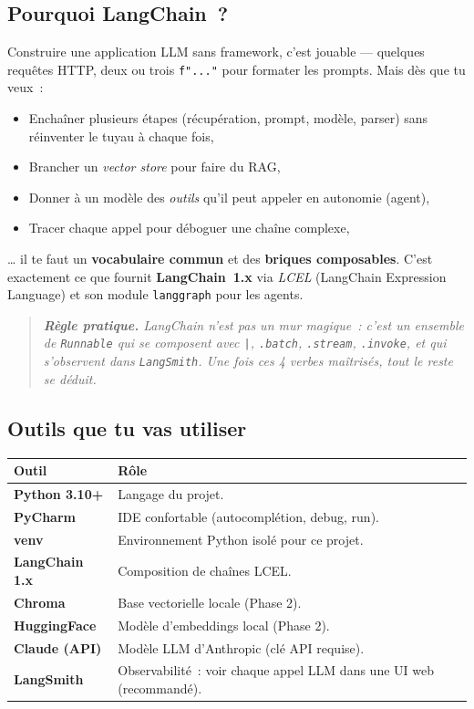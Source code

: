 \documentclass[11pt,a4paper]{article}
\begin{document}
\subsection{Pourquoi LangChain~?}

Construire une application LLM sans framework, c'est jouable —
quelques requêtes HTTP, deux ou trois \texttt{f"..."} pour formater
les prompts. Mais dès que tu veux~:

\begin{itemize}[leftmargin=*]
  \item Enchaîner plusieurs étapes (récupération, prompt, modèle,
        parser) sans réinventer le tuyau à chaque fois,
  \item Brancher un \emph{vector store} pour faire du RAG,
  \item Donner à un modèle des \emph{outils} qu'il peut appeler en
        autonomie (agent),
  \item Tracer chaque appel pour déboguer une chaîne complexe,
\end{itemize}

\noindent\dots{} il te faut un \textbf{vocabulaire commun} et des
\textbf{briques composables}. C'est exactement ce que fournit
\textbf{LangChain~1.x} via \emph{LCEL} (LangChain Expression
Language) et son module \texttt{langgraph} pour les agents.

\begin{quote}\itshape
\textbf{Règle pratique.} LangChain n'est pas un mur magique~: c'est
un ensemble de \texttt{Runnable} qui se composent avec \texttt{|},
\texttt{.batch}, \texttt{.stream}, \texttt{.invoke}, et qui
s'observent dans \texttt{LangSmith}. Une fois ces 4 verbes maîtrisés,
tout le reste se déduit.
\end{quote}

\subsection{Outils que tu vas utiliser}

\begin{center}
\begin{tabular}{p{3.6cm} p{12cm}}
\toprule
\textbf{Outil} & \textbf{Rôle} \\
\midrule
\textbf{Python 3.10+}     & Langage du projet. \\
\textbf{PyCharm}          & IDE confortable (autocomplétion, debug, run). \\
\textbf{venv}             & Environnement Python isolé pour ce projet. \\
\textbf{LangChain 1.x}    & Composition de chaînes LCEL. \\
\textbf{Chroma}           & Base vectorielle locale (Phase 2). \\
\textbf{HuggingFace}      & Modèle d'embeddings local (Phase 2). \\
\textbf{Claude (API)}     & Modèle LLM d'Anthropic (clé API requise). \\
\textbf{LangSmith}        & Observabilité~: voir chaque appel LLM dans
                            une UI web (recommandé). \\
\bottomrule
\end{tabular}
\end{center}
\end{document}
